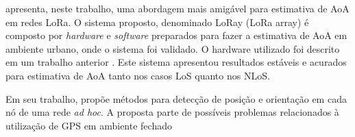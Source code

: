 \citeauthor{bnilam2020lora} \cite{bnilam2020lora} apresenta, neste trabalho, uma abordagem mais amigável para estimativa de \ac{AoA} em redes \ac{LoRa}.
O sistema proposto, denominado LoRay (\ac{LoRa} array) é composto por \textit{hardware} e \textit{software} preparados para fazer a estimativa de \ac{AoA} em ambiente urbano, onde o sistema foi validado.
O hardware utilizado foi descrito em um trabalho anterior \cite{bnilam2019low}.
Este sistema apresentou resultados estáveis e acurados para estimativa de \ac{AoA} tanto nos casos \ac{LoS} quanto nos \ac{NLoS}.



Em seu trabalho, \citeauthor{niculescu2003ad} \cite{niculescu2003ad} propõe métodos para detecção de posição e orientação em cada nó de uma rede \textit{ad hoc}.
A proposta parte de possíveis problemas relacionados à utilização de \ac{GPS} em ambiente fechado


